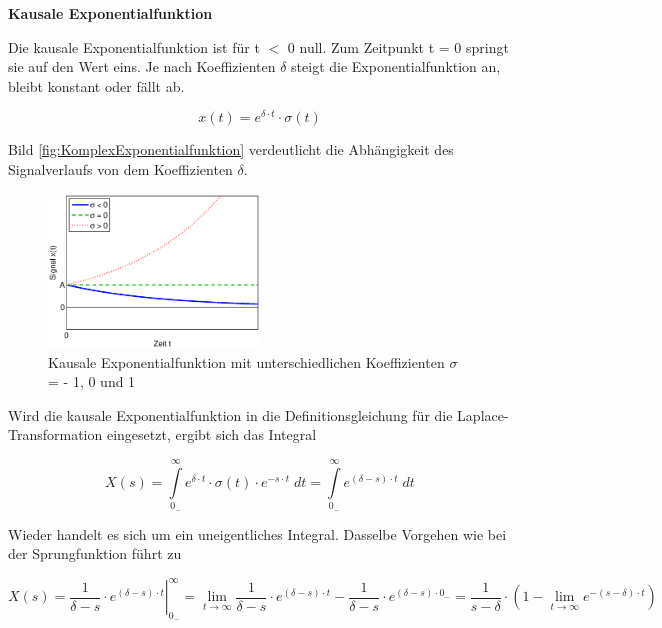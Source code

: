 {\selectfont
\noindent\textbf{Kausale Exponentialfunktion}}\smallskip

\noindent Die kausale Exponentialfunktion ist für t $\mathrm{<}$ 0 null. Zum Zeitpunkt t = 0 springt sie auf den Wert eins. Je nach Koeffizienten $\delta$ steigt die Exponentialfunktion an, bleibt konstant oder fällt ab. 

\begin{equation}\label{eq:foureighteen}
x\left(t\right)=e^{\delta \cdot t} \cdot \sigma \left(t\right) 
\end{equation}

\noindent Bild \ref{fig:KomplexExponentialfunktion} verdeutlicht die Abhängigkeit des Signalverlaufs von dem Koeffizienten $\delta$.

\begin{figure}[H]
  \centerline{\includegraphics[width=0.5\textwidth]{Kapitel3/Bilder/image5}}
  \caption{Kausale Exponentialfunktion mit unterschiedlichen Koeffizienten $\sigma$ = - 1, 0 und 1}
  \label{fig:LaplaceSignaleExponentialfunktion}
\end{figure}

\noindent Wird die kausale Exponentialfunktion in die Definitionsgleichung für die Laplace-Transformation
eingesetzt, ergibt sich das Integral

\begin{equation}\label{eq:fournineteen}
X\left(s\right)=\int\limits _{0_{-} }^{\infty }e^{\delta \cdot t} \cdot \sigma \left(t\right)\cdot e^{-s\cdot t}\; dt=\int\limits _{0_{-} }^{\infty }e^{\left(\delta -s\right)\cdot t} \;dt 
\end{equation}

\noindent Wieder handelt es sich um ein uneigentliches Integral. Dasselbe Vorgehen wie bei der Sprungfunktion führt zu 

\begin{equation}\label{eq:fourtwenty}
X\left(s\right)=\left. \frac{1}{\delta -s} \cdot e^{\left(\delta -s\right)\cdot t} \right|_{0_{-} }^{\infty } =\lim \limits_{t\to \infty }  \frac{1}{\delta -s} \cdot e^{\left(\delta -s\right)\cdot t} -\frac{1}{\delta -s} \cdot e^{\left(\delta -s\right)\cdot 0_{-} } =\frac{1}{s-\delta } \cdot \left(1-\lim \limits_{t\to \infty } e^{-\left(s-\delta \right)\cdot t} \right)
\end{equation}

